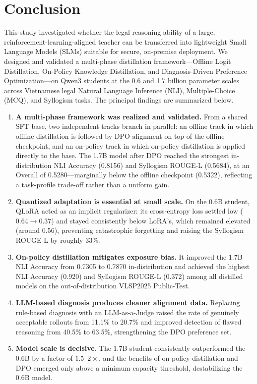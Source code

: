 \section{Conclusion}

This study investigated whether the legal reasoning ability of a large, reinforcement-learning-aligned teacher can be transferred into lightweight Small Language Models (SLMs) suitable for secure, on-premise deployment. We designed and validated a multi-phase distillation framework---Offline Logit Distillation, On-Policy Knowledge Distillation, and Diagnosis-Driven Preference Optimization---on Qwen3 students at the 0.6 and 1.7 billion parameter scales across Vietnamese legal Natural Language Inference (NLI), Multiple-Choice (MCQ), and Syllogism tasks. The principal findings are summarized below.

\begin{enumerate}
    \item \textbf{A multi-phase framework was realized and validated.} From a shared SFT base, two independent tracks branch in parallel: an offline track in which offline distillation \parencite{hinton2015distillingknowledgeneuralnetwork} is followed by DPO alignment \parencite{rafailov2024directpreferenceoptimizationlanguage} on top of the offline checkpoint, and an on-policy track in which on-policy distillation \parencite{agarwal2024onpolicydistillationlanguagemodels} is applied directly to the base. The 1.7B model after DPO reached the strongest in-distribution NLI Accuracy (0.8156) and Syllogism ROUGE-L (0.5684), at an Overall of 0.5280---marginally below the offline checkpoint (0.5322), reflecting a task-profile trade-off rather than a uniform gain.
    \item \textbf{Quantized adaptation is essential at small scale.} On the 0.6B student, QLoRA acted as an implicit regularizer: its cross-entropy loss settled low ($0.64 \rightarrow 0.37$) and stayed consistently below LoRA's, which remained elevated (around $0.56$), preventing catastrophic forgetting and raising the Syllogism ROUGE-L by roughly 33\%.
    \item \textbf{On-policy distillation mitigates exposure bias.} It improved the 1.7B NLI Accuracy from 0.7305 to 0.7870 in-distribution and achieved the highest NLI Accuracy (0.920) and Syllogism ROUGE-L (0.372) among all distilled models on the out-of-distribution VLSP2025 Public-Test.
    \item \textbf{LLM-based diagnosis produces cleaner alignment data.} Replacing rule-based diagnosis with an LLM-as-a-Judge raised the rate of genuinely acceptable rollouts from 11.1\% to 20.7\% and improved detection of flawed reasoning from 40.5\% to 63.5\%, strengthening the DPO preference set.
    \item \textbf{Model scale is decisive.} The 1.7B student consistently outperformed the 0.6B by a factor of $1.5$--$2\times$, and the benefits of on-policy distillation and DPO emerged only above a minimum capacity threshold, destabilizing the 0.6B model.
\end{enumerate}

